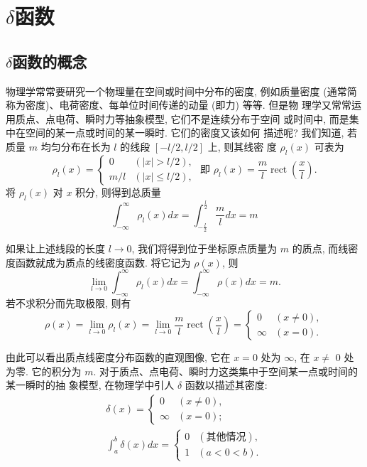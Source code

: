 \section{$\delta$函数}
\label{sub:delta_function}

\subsection{$\delta$函数的概念}

物理学常常要研究一个物理量在空间或时间中分布的密度, 例如质量密度 (通常简称为密度)、电荷密度、每单位时间传递的动量 (即力) 等等. 但是物 理学又常常运用质点、点电荷、瞬时力等抽象模型, 它们不是连续分布于空间 或时间中, 而是集中在空间的某一点或时间的某一瞬时. 它们的密度又该如何 描述呢?
我们知道, 若质量 $m$ 均匀分布在长为 $l$ 的线段 $[-l / 2, l / 2]$ 上, 则其线密 度 $\rho_l(x)$ 可表为
$$
\rho_l(x)=\left\{\begin{array}{ll}
0 & (|x|>l / 2), \\
m / l & (|x| \leqslant l / 2),
\end{array} \text { 即 } \rho_l(x)=\frac{m}{l} \operatorname{rect}\left(\frac{x}{l}\right) .\right.
$$
将 $\rho_l(x)$ 对 $x$ 积分, 则得到总质量
$$
\int_{-\infty}^{\infty} \rho_l(x) d x=\int_{-\frac{l}{2}}^{\frac{l}{2}} \frac{m}{l} d x=m
$$

如果让上述线段的长度 $l \rightarrow 0$, 我们将得到位于坐标原点质量为 $m$ 的质点, 而线密度函数就成为质点的线密度函数. 将它记为 $\rho(x)$, 则
$$
\lim _{l \rightarrow 0} \int_{-\infty}^{\infty} \rho_l(x) d x=\int_{-\infty}^{\infty} \rho(x) d x=m .
$$
若不求积分而先取极限, 则有
$$
\rho(x)=\lim _{l \rightarrow 0} \rho_l(x)=\lim _{l \rightarrow 0} \frac{m}{l} \operatorname{rect}\left(\frac{x}{l}\right)= \begin{cases}0 & (x \neq 0), \\ \infty & (x=0) .\end{cases}
$$

由此可以看出质点线密度分布函数的直观图像, 它在 $x=0$ 处为 $\infty$, 在 $x \neq$ 0 处为零. 它的积分为 $m$.
对于质点、点电荷、瞬时力这类集中于空间某一点或时间的某一瞬时的抽 象模型, 在物理学中引人 $\delta$ 函数以描述其密度:
$$
\begin{gathered}
\delta(x)= \begin{cases}0 & (x \neq 0), \\
\infty & (x=0) ;\end{cases} \\
\int_a^b \delta(x) d x= \begin{cases}0 & (\text{其他情况}), \\
1 & (a<0<b) .\end{cases}
\end{gathered}
$$

